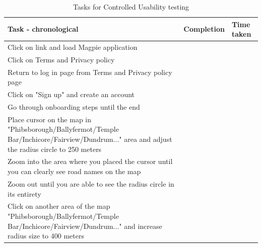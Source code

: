 \documentclass{report}
\begin{document}
\begin{table}[h!]
    \centering
    \caption{Tasks for Controlled Usability testing}
    \label{tab:table2}
    \begin{tabularx}{\textwidth}{|p{}|X|X|}
        \hline
        \textbf{Task - chronological}                                                                                                                  & \textbf{Completion} & \textbf{Time taken} \\ \hline
        Click on link and load Magpie application                                                                                                      &                     &                     \\ \hline
        Click on Terms and Privacy policy                                                                                                              &                     &                     \\ \hline
        Return to log in page from Terms and Privacy policy page                                                                                       &                     &                     \\ \hline
        Click on "Sign up" and create an account                                                                                                       &                     &                     \\ \hline
        Go through onboarding steps until the end                                                                                                      &                     &                     \\ \hline
        Place cursor on the map in "Phibsborough/Ballyfermot/Temple Bar/Inchicore/Fairview/Dundrum..." area and adjust the radius circle to 250 meters &                     &                     \\ \hline
        Zoom into the area where you placed the cursor until you can clearly see road names on the map                                                 &                     &                     \\ \hline
        Zoom out until you are able to see the radius circle in its entirety                                                                           &                     &                     \\ \hline
        Click on another area of the map "Phibsborough/Ballyfermot/Temple Bar/Inchicore/Fairview/Dundrum..." and increase radius size to 400 meters    &                     &                     \\ \hline

\end{tabularx}
\end{table}
\end{document}
